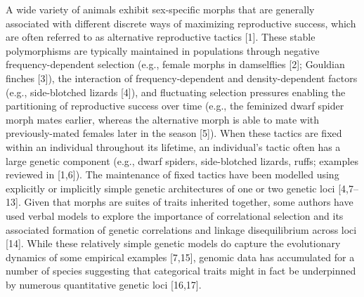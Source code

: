 \documentclass[
  11pt,
  a4paper,
]{article}
\begin{document}
A wide variety of animals exhibit sex-specific morphs that are generally
associated with different discrete ways of maximizing reproductive
success, which are often referred to as alternative reproductive tactics
{[}1{]}. These stable
polymorphisms are typically maintained in populations through negative
frequency-dependent selection (e.g., female morphs in damselflies
{[}2{]}; Gouldian finches
{[}3{]}), the interaction
of frequency-dependent and density-dependent factors (e.g.,
side-blotched lizards {[}4{]}), and fluctuating
selection pressures enabling the partitioning of reproductive success
over time (e.g., the feminized dwarf spider morph mates earlier, whereas
the alternative morph is able to mate with previously-mated females
later in the season {[}5{]}).
When these tactics are fixed within an individual throughout its
lifetime, an individual's tactic often has a large genetic component
(e.g., dwarf spiders, side-blotched lizards, ruffs; examples reviewed in
{[}1,6{]}). The maintenance of fixed tactics
have been modelled using explicitly or implicitly simple genetic
architectures of one or two genetic loci
{[}4,7--13{]}. Given that morphs are suites of
traits inherited together, some authors have used verbal models to
explore the importance of correlational selection and its associated
formation of genetic correlations and linkage disequilibrium across loci
{[}14{]}. While these relatively
simple genetic models do capture the evolutionary dynamics of some
empirical examples {[}7,15{]}, genomic data has accumulated
for a number of species suggesting that categorical traits might in fact
be underpinned by numerous quantitative genetic loci
{[}16,17{]}.
\end{document}
